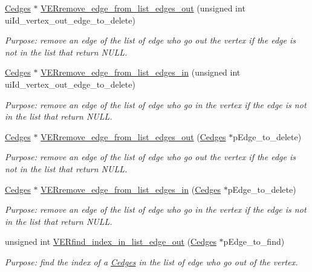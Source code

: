 \begin{DoxyCompactItemize}
\hyperlink{class_cedges}{Cedges} $\ast$ \hyperlink{class_cvertex_a44706c419e68981b586735e6af81edc1}{V\+E\+Rremove\+\_\+edge\+\_\+from\+\_\+list\+\_\+edges\+\_\+out} (unsigned int ui\+Id\+\_\+vertex\+\_\+out\+\_\+edge\+\_\+to\+\_\+delete)
\begin{DoxyCompactList}\small\item\em Purpose\+: remove an edge of the list of edge who go out the vertex if the edge is not in the list that return N\+U\+L\+L. \end{DoxyCompactList}\item 
\hyperlink{class_cedges}{Cedges} $\ast$ \hyperlink{class_cvertex_a4132709e06e653282a058fedb5274116}{V\+E\+Rremove\+\_\+edge\+\_\+from\+\_\+list\+\_\+edges\+\_\+in} (unsigned int ui\+Id\+\_\+vertex\+\_\+out\+\_\+edge\+\_\+to\+\_\+delete)
\begin{DoxyCompactList}\small\item\em Purpose\+: remove an edge of the list of edge who go in the vertex if the edge is not in the list that return N\+U\+L\+L. \end{DoxyCompactList}\item 
\hyperlink{class_cedges}{Cedges} $\ast$ \hyperlink{class_cvertex_ab699b9cc8727c4cef97ef26de16aaa0d}{V\+E\+Rremove\+\_\+edge\+\_\+from\+\_\+list\+\_\+edges\+\_\+out} (\hyperlink{class_cedges}{Cedges} $\ast$p\+Edge\+\_\+to\+\_\+delete)
\begin{DoxyCompactList}\small\item\em Purpose\+: remove an edge of the list of edge who go out the vertex if the edge is not in the list that return N\+U\+L\+L. \end{DoxyCompactList}\item 
\hyperlink{class_cedges}{Cedges} $\ast$ \hyperlink{class_cvertex_a49d5999465dd41b5d64f5339c2476272}{V\+E\+Rremove\+\_\+edge\+\_\+from\+\_\+list\+\_\+edges\+\_\+in} (\hyperlink{class_cedges}{Cedges} $\ast$p\+Edge\+\_\+to\+\_\+delete)
\begin{DoxyCompactList}\small\item\em Purpose\+: remove an edge of the list of edge who go in the vertex if the edge is not in the list that return N\+U\+L\+L. \end{DoxyCompactList}\item 
unsigned int \hyperlink{class_cvertex_a2091154529123d16fb0913c6a23f11c1}{V\+E\+Rfind\+\_\+index\+\_\+in\+\_\+list\+\_\+edge\+\_\+out} (\hyperlink{class_cedges}{Cedges} $\ast$p\+Edge\+\_\+to\+\_\+find)
\begin{DoxyCompactList}\small\item\em Purpose\+: find the index of a \hyperlink{class_cedges}{Cedges} in the list of edge who go out of the vertex. \end{DoxyCompactList}\item 

\end{DoxyCompactItemize}

